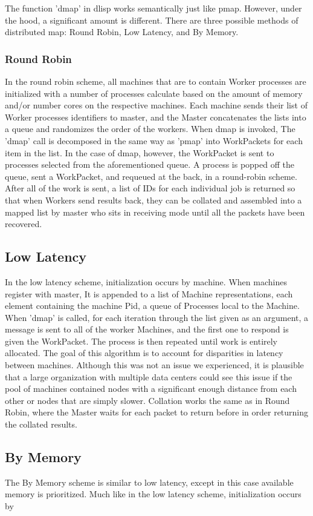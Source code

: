 \documentclass[letterpaper,twocolumn,10pt]{article}
\begin{document}
The function 'dmap' in dlisp works semantically just like pmap. However, under the hood, 
a significant amount is different. There are three possible methods of distributed map:
Round Robin, Low Latency, and By Memory.

\subsubsection{Round Robin}

In the round robin scheme, all machines that are to contain Worker processes are initialized
with a number of processes calculate based on the amount of memory and/or number cores on the
respective machines. Each machine sends their list of Worker processes identifiers to master, 
and the Master concatenates the lists into a queue and randomizes the order of the workers.
When dmap is  invoked, The 'dmap' call is decomposed in the same way as 'pmap' into WorkPackets
for each item in the list. In the case of dmap, however, the WorkPacket is sent to processes
selected from the aforementioned queue. A process is popped off the queue, sent a WorkPacket,
and requeued at the back, in a round-robin scheme. After all of the work is sent, a list of IDs
for each individual job is returned so that when Workers send results back, they can be collated
and assembled into a mapped list by master who sits in receiving mode until all the packets have
been recovered. 


\subsection{Low Latency}

In the low latency scheme, initialization occurs by machine. When machines register with master,
It is appended to a list of Machine representations, each element containing the machine Pid, 
a queue of Processes local to the Machine. When 'dmap' is called, for each iteration through the
list given as an argument, a message is sent to all of the worker Machines, and the first one to
respond is given the WorkPacket. The process is then repeated until work is entirely allocated.
The goal of this algorithm is to account for disparities in latency between machines. Although this
was not an issue we experienced, it is plausible that a large organization with multiple data centers
could see this issue if the pool of machines contained nodes with a significant enough distance from
each other or nodes that are simply slower. Collation works the same as in Round Robin, where
the Master waits for each packet to return before in order returning the collated results.

\subsection{By Memory}

The By Memory scheme is similar to low latency, except in this case available memory is prioritized.
Much like in the low latency scheme, initialization occurs by 
\end{document}
